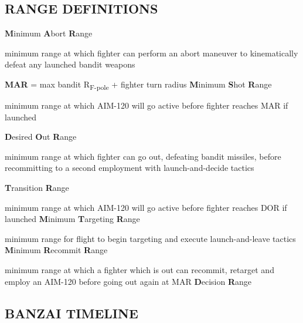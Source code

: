 \subsection{RANGE DEFINITIONS}

\begin{tcoloritemize}
    \blueitem[WEZ]
    \blueitem[MAR] \textbf{M}inimum \textbf{A}bort \textbf{R}ange

    \medskip
    minimum range at which fighter can perform an abort maneuver to kinematically defeat any launched bandit weapons 

    \medskip
    \textbf{MAR} = max bandit R\textsubscript{F-pole} + fighter turn radius
    \blueitem[MSR] \textbf{M}inimum \textbf{S}hot \textbf{R}ange

    \medskip
    minimum range at which AIM-120 will go active before fighter reaches MAR if launched

    \blueitem[DOR] \textbf{D}esired \textbf{O}ut \textbf{R}ange

    \medskip
    minimum range at which fighter can go out, defeating bandit missiles, 
    before recommitting to a second employment with launch-and-decide tactics

    \blueitem[TR] \textbf{T}ransition \textbf{R}ange

    \medskip
    minimum range at which AIM-120 will go active before fighter reaches DOR if launched
    \blueitem[MTR] \textbf{M}inimum \textbf{T}argeting \textbf{R}ange

    \medskip
    minimum range for flight to begin targeting and execute launch-and-leave tactics
    \blueitem[MRR] \textbf{M}inimum \textbf{R}ecommit \textbf{R}ange

    \medskip
    minimum range at which a fighter which is out can recommit, 
    retarget and employ an AIM-120 before going out again at MAR
    \blueitem[DR] \textbf{D}ecision \textbf{R}ange
\end{tcoloritemize}

\marginfigeometry

\subsection{BANZAI TIMELINE}
\label{subsec:ttpaa:timeline:banzai}

